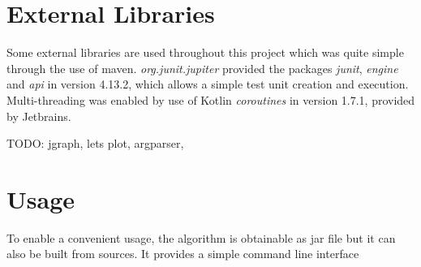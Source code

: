 \section{External Libraries}
\label{ch:Implementation:external-libs}
Some external libraries are used throughout this project which was quite simple through the use of maven.
\emph{org.junit.jupiter} provided the packages \emph{junit}, \emph{engine} and \emph{api} in version 4.13.2, which allows a simple test unit creation and execution. Multi-threading was enabled by use of Kotlin \emph{coroutines} in version 1.7.1, provided by Jetbrains.

TODO: jgraph, lets plot, argparser, 

\section{Usage}
\label{ch:Implementation:usage}
To enable a convenient usage, the algorithm is obtainable as jar file but it can also be built from sources. It provides a simple command line interface

